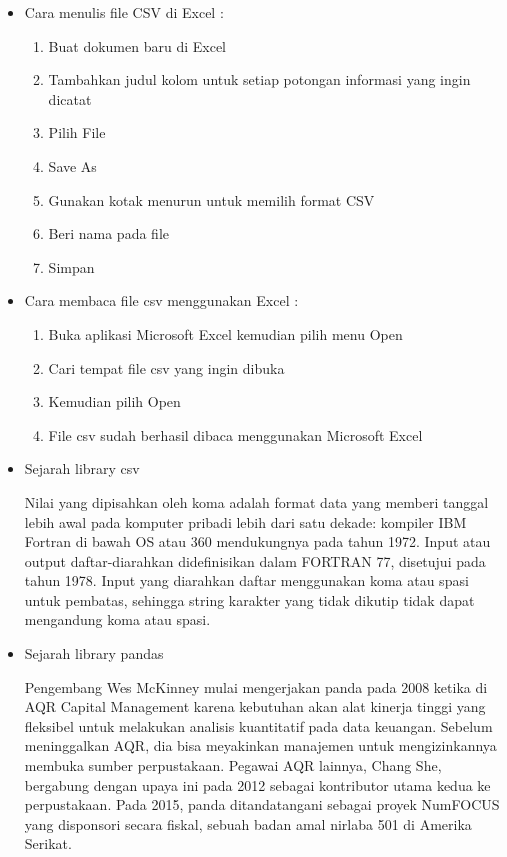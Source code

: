 \begin{enumerate}
\begin{itemize}
	\item Cara menulis file CSV di Excel :
				\begin{enumerate}
					\item Buat dokumen baru di Excel
					\item Tambahkan judul kolom untuk setiap potongan informasi yang ingin dicatat
					\item Pilih File
					\item Save As
					\item Gunakan kotak menurun untuk memilih format CSV 
					\item Beri nama pada file
					\item Simpan
				\end{enumerate}
	\item Cara membaca file csv menggunakan Excel :
				\begin{enumerate}
					\item Buka aplikasi Microsoft Excel kemudian pilih menu Open
					\item Cari tempat file csv yang ingin dibuka 
					\item Kemudian pilih Open
					\item File csv sudah berhasil dibaca menggunakan Microsoft Excel
				\end{enumerate}
	\item Sejarah library csv
		\par Nilai yang dipisahkan oleh koma adalah format data yang memberi tanggal lebih awal pada komputer pribadi lebih dari satu dekade: kompiler IBM Fortran di bawah OS atau 360 mendukungnya pada tahun 1972. Input atau output daftar-diarahkan didefinisikan dalam FORTRAN 77, disetujui pada tahun 1978. Input yang diarahkan daftar menggunakan koma atau spasi untuk pembatas, sehingga string karakter yang tidak dikutip tidak dapat mengandung koma atau spasi.
		
	\item Sejarah library pandas
		\par Pengembang Wes McKinney mulai mengerjakan panda pada 2008 ketika di AQR Capital Management karena kebutuhan akan alat kinerja tinggi yang fleksibel untuk melakukan analisis kuantitatif pada data keuangan. Sebelum meninggalkan AQR, dia bisa meyakinkan manajemen untuk mengizinkannya membuka sumber perpustakaan. Pegawai AQR lainnya, Chang She, bergabung dengan upaya ini pada 2012 sebagai kontributor utama kedua ke perpustakaan. Pada 2015, panda ditandatangani sebagai proyek NumFOCUS yang disponsori secara fiskal, sebuah badan amal nirlaba 501 di Amerika Serikat.
		

\end{itemize}
\end{enumerate}
